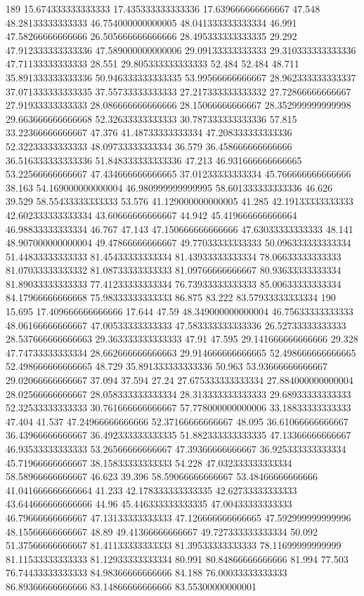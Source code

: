 189 15.674333333333333 17.435333333333336 17.639666666666667 47.548 48.28133333333333 46.754000000000005 48.041333333333334 46.991 47.58266666666666 26.505666666666666 28.495333333333335 29.292 47.912333333333336 47.589000000000006 29.09133333333333 29.310333333333336 47.71133333333333 28.551 29.805333333333333 52.484 52.484 48.711 35.891333333333336 50.946333333333335 53.99566666666667 28.962333333333337 37.071333333333335 37.55733333333333 27.217333333333332 27.72866666666667 27.91933333333333 28.086666666666666 28.15066666666667 28.352999999999998 29.663666666666668 52.32633333333333 30.787333333333336 57.815 33.22366666666667 47.376 41.48733333333334 47.208333333333336 52.32233333333333 48.09733333333334 36.579 36.458666666666666 36.516333333333336 51.848333333333336 47.213 46.931666666666665 53.22566666666667 47.434666666666665 37.01233333333334 45.766666666666666 38.163 54.169000000000004 46.980999999999995 58.601333333333336 46.626 39.529 58.55433333333333 53.576 41.129000000000005 41.285 42.19133333333333 42.602333333333334 43.60666666666667 44.942 45.419666666666664 46.98833333333334 46.767 47.143 47.150666666666666 47.63033333333333 48.141 48.907000000000004 49.47866666666667 49.77033333333333 50.096333333333334 51.44833333333333 81.45433333333334 81.43933333333334 78.06633333333333 81.07033333333332 81.08733333333333 81.09766666666667 80.93633333333334 81.89033333333333 77.41233333333334 76.73933333333333 85.00633333333334 84.17966666666668 75.98333333333333 86.875 83.222 83.57933333333334
190 15.695 17.409666666666666 17.644 47.59 48.349000000000004 46.75633333333333 48.06166666666667 47.00533333333333 47.583333333333336 26.52733333333333 28.537666666666663 29.363333333333333 47.91 47.595 29.141666666666666 29.328 47.74733333333334 28.662666666666663 29.914666666666665 52.498666666666665 52.498666666666665 48.729 35.891333333333336 50.963 53.93666666666667 29.02066666666667 37.094 37.594 27.24 27.675333333333334 27.884000000000004 28.02566666666667 28.058333333333334 28.313333333333333 29.68933333333333 52.32533333333333 30.761666666666667 57.778000000000006 33.18833333333333 47.404 41.537 47.24966666666666 52.37166666666667 48.095 36.61066666666667 36.43966666666667 36.492333333333335 51.882333333333335 47.13366666666667 46.93533333333333 53.26566666666667 47.39366666666667 36.925333333333334 45.71966666666667 38.15833333333333 54.228 47.032333333333334 58.58966666666667 46.623 39.396 58.59066666666667 53.48466666666666 41.041666666666664 41.233 42.178333333333335 42.62733333333333 43.644666666666666 44.96 45.446333333333335 47.00433333333333 46.79666666666667 47.13133333333333 47.126666666666665 47.592999999999996 48.15566666666667 48.89 49.41366666666667 49.727333333333334 50.092 51.37566666666667 81.41133333333333 81.39533333333333 78.11699999999999 81.11533333333333 81.12933333333334 80.991 80.84866666666666 81.994 77.503 76.74433333333333 84.98366666666666 84.188 76.00033333333333 86.89366666666666 83.14866666666666 83.55300000000001